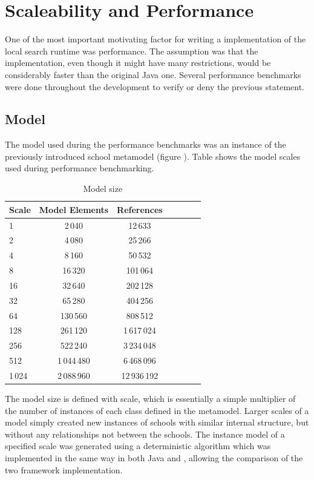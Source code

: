 \chapter{Scaleability and Performance}

One of the most important motivating factor for writing a \CPP{} implementation
of the local search runtime was performance. The assumption was that the \CPP{}
implementation, even though it might have many restrictions, would be
considerably faster than the original Java one. Several performance benchmarks
were done throughout the development to verify or deny the previous statement.

\section{Model}

The model used during the performance benchmarks was an instance of the
previously introduced school metamodel (figure ).
Table  shows the model scales used during performance
benchmarking.

\begin{table}[ht]
	\footnotesize
	\centering
	\caption{Model size}\label{tab:model_size}
	\begin{tabular}{ | l | c | c | c | c | c | c |}
	\hline
	Scale	& Model Elements	& References	\\ \hline
	1 		&  2\,040			& 12\,633		\\
	2 		&  4\,080			& 25\,266		\\
	4		&  8\,160			& 50\,532		\\
	8		&  16\,320			& 101\,064		\\	
	16 		&  32\,640			& 202\,128		\\	
	32		&  65\,280			& 404\,256		\\	
	64 		&  130\,560			& 808\,512		\\	
	128 	&  261\,120			& 1\,617\,024	\\	
	256 	&  522\,240			& 3\,234\,048	\\	
	512		&  1\,044\,480		& 6\,468\,096	\\
	1\,024	&  2\,088\,960		& 12\,936\,192	\\	
	\hline
	\end{tabular}
	\label{tab:TabularExample}
\end{table}

The model size is defined with scale, which is essentially a simple multiplier
of the number of instances of each class defined in the metamodel. Larger
scales of a model simply created new instances of schools with similar
internal structure, but without any relationships not between the schools. The
instance model of a specified scale was generated using a deterministic
algorithm which was implemented in the same way in both Java and \CPP{},
allowing the comparison of the two framework implementation.

